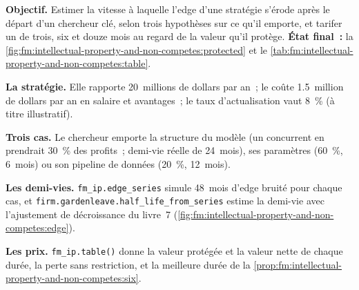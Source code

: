 \begin{tutorial}
\textbf{Objectif.} Estimer la vitesse à laquelle l'edge d'une stratégie s'érode après le départ d'un chercheur clé, selon trois hypothèses sur ce qu'il emporte, et tarifer
un  de trois, six et douze mois au regard de la valeur qu'il protège. \textbf{État final~:}
la \cref{fig:fm:intellectual-property-and-non-competes:protected} et le \cref{tab:fm:intellectual-property-and-non-competes:table}.
\begin{tutsteps}
\item \textbf{La stratégie.} Elle rapporte 20~millions de dollars par an~; le  coûte 1.5~million de dollars par an en salaire et avantages~; le taux d'actualisation vaut 8~\%
(à titre illustratif).
\item \textbf{Trois cas.} Le chercheur emporte la structure du modèle (un concurrent en prendrait 30~\% des profits~; demi-vie réelle de 24~mois),
ses paramètres (60~\%, 6~mois) ou son pipeline de données (20~\%, 12~mois).
\item \textbf{Les demi-vies.} \texttt{fm\_ip.edge\_series} simule 48~mois d'edge bruité pour chaque cas, et \texttt{firm.gardenleave.half\_life\_from\_series}
estime la demi-vie avec l'ajustement de décroissance du livre~7 (\cref{fig:fm:intellectual-property-and-non-competes:edge}).
\item \textbf{Les prix.} \texttt{fm\_ip.table()} donne la valeur protégée et la valeur nette de chaque durée, la perte sans restriction, et la
meilleure durée de la \cref{prop:fm:intellectual-property-and-non-competes:six}.
\end{tutsteps}
\end{tutorial}

